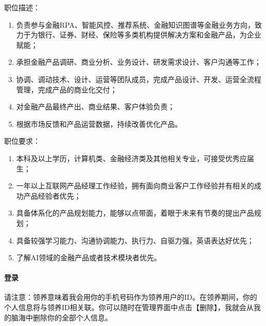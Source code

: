 \documentclass[letterpaper,11pt,english]{sphinxmanual}
\begin{document}
职位描述：
\begin{enumerate}
%
\item {} 
负责参与金融RPA、智能风控、推荐系统、金融知识图谱等金融业务方向，致力于为银行、证券、财经、保险等多类机构提供解决方案和金融产品，为企业赋能；

\item {} 
承担金融产品调研、商业分析、业务设计、研发需求设计、客户沟通等工作；

\item {} 
协调、调动技术、设计、运营等团队成员，完成产品设计、开发、运营全流程管理，完成产品的商业化交付；

\item {} 
对金融产品最终产出、商业结果、客户体验负责；

\item {} 
根据市场反馈和产品运营数据，持续改善优化产品。

\end{enumerate}

职位要求：
\begin{enumerate}
%
\item {} 
本科及以上学历，计算机类、金融经济类及其他相关专业，可接受优秀应届生；

\item {} 
一年以上互联网产品经理工作经验，拥有面向商业客户工作经验并有相关的成功产品经验者优先；

\item {} 
具备体系化的产品规划能力，能够以点带面，着眼于未来有节奏的提出产品规划；

\item {} 
具备较强学习能力、沟通协调能力、执行力、自驱力强，英语表达好优先；

\item {} 
了解AI领域的金融产品或者技术模块者优先。

\end{enumerate}


\paragraph{登录}
\label{\detokenize{chapter_company/xiaoice:id7}}
请注意：领养意味着我会用你的手机号码作为领养用户的ID。在领养期间，你的个人信息将与领养ID相关联。你可以随时在管理界面中点击【删除】，我就会从我的脑海中删除你的全部个人信息。%
\begin{footnote}[936]\sphinxAtStartFootnote
{}
%
\end{footnote}
\end{document}
